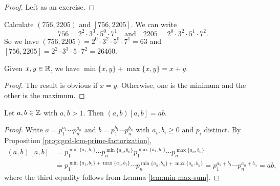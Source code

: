 \begin{proof}
  Left as an exercise.
\end{proof}

\begin{example}
  Calculate $(756, 2205)$ and
  $[756, 2205]$. We can write
  \[
    756 = 2^2 \cdot 3^3 \cdot 5^0 \cdot 7^1
    \quad \text{and} \quad
    2205 = 2^0 \cdot 3^2 \cdot 5^1 \cdot 7^2.
  \]
  So we have
  $(756, 2205) = 2^0 \cdot 3^2 \cdot 5^0 \cdot 7^1 = 63$ and
  $[756, 2205] = 2^2 \cdot 3^3 \cdot 5 \cdot 7^2 = 26460$.
\end{example}

\begin{lemma}\label{lem:min-max-sum}
  Given $x, y \in \mathbb{R}$, we have
  $\min\{x, y\} + \max\{x, y\} = x + y$.
\end{lemma}

\begin{proof}
  The result is obvious if $x = y$.
  Otherwise, one is the minimum and the
  other is the maximum.
\end{proof}

\begin{theorem}
  Let $a, b \in \mathbb{Z}$ with $a, b > 1$. Then
  $(a, b) [a, b] = ab$.
\end{theorem}

\begin{proof}
  Write $a = p_1^{a_1} \cdots p_n^{a_n}$
  and $b = p_1^{b_1} \cdots p_n^{b_n}$
  with $a_i, b_i \ge 0$ and $p_i$
  distinct. By Proposition
  \ref{prop:gcd-lcm-prime-factorization},
  \begin{align*}
    (a, b) [a, b]
    &= p_1^{\min\{a_1, b_1\}} \cdots p_n^{\min\{a_n, b_n\}}
      p_1^{\max\{a_1, b_1\}} \cdots p_n^{\max\{a_n, b_n\}} \\
    &= p_1^{\min\{a_1, b_1\} + \max\{a_1, b_1\}} \cdots
      p_n^{\min\{a_n, b_n\} + \max\{a_n, b_n\}}
    = p_1^{a_1 + b_1} \cdots p_n^{a_n + b_n}
    = ab,
  \end{align*}
  where the third equality follows
  from Lemma \ref{lem:min-max-sum}.
\end{proof}
